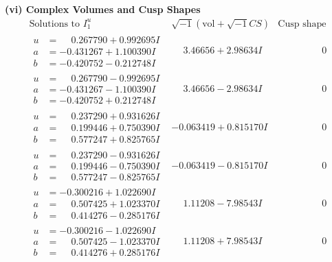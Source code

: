 \documentclass[1p]{elsarticle_modified}
\theoremstyle{definition}
\newcommand{\I}{\sqrt{-1}}
\begin{document}
\newpage\flushleft \textbf{(vi) Complex Volumes and Cusp Shapes}
$$\begin{array}{c|c|c}  
\text{Solutions to }I^u_{1}& \I (\text{vol} + \sqrt{-1}CS) & \text{Cusp shape}\\
 \hline 
\begin{aligned}
u &= \phantom{-}0.267790 + 0.992695 I \\
a &= -0.431267 + 1.100390 I \\
b &= -0.420752 - 0.212748 I\end{aligned}
 & \phantom{-}3.46656 + 2.98634 I & \phantom{-0.000000 } 0 \\ \hline\begin{aligned}
u &= \phantom{-}0.267790 - 0.992695 I \\
a &= -0.431267 - 1.100390 I \\
b &= -0.420752 + 0.212748 I\end{aligned}
 & \phantom{-}3.46656 - 2.98634 I & \phantom{-0.000000 } 0 \\ \hline\begin{aligned}
u &= \phantom{-}0.237290 + 0.931626 I \\
a &= \phantom{-}0.199446 + 0.750390 I \\
b &= \phantom{-}0.577247 + 0.825765 I\end{aligned}
 & -0.063419 + 0.815170 I & \phantom{-0.000000 } 0 \\ \hline\begin{aligned}
u &= \phantom{-}0.237290 - 0.931626 I \\
a &= \phantom{-}0.199446 - 0.750390 I \\
b &= \phantom{-}0.577247 - 0.825765 I\end{aligned}
 & -0.063419 - 0.815170 I & \phantom{-0.000000 } 0 \\ \hline\begin{aligned}
u &= -0.300216 + 1.022690 I \\
a &= \phantom{-}0.507425 + 1.023370 I \\
b &= \phantom{-}0.414276 - 0.285176 I\end{aligned}
 & \phantom{-}1.11208 - 7.98543 I & \phantom{-0.000000 } 0 \\ \hline\begin{aligned}
u &= -0.300216 - 1.022690 I \\
a &= \phantom{-}0.507425 - 1.023370 I \\
b &= \phantom{-}0.414276 + 0.285176 I\end{aligned}
 & \phantom{-}1.11208 + 7.98543 I & \phantom{-0.000000 } 0 \\ \hline\begin{aligned}

\end{aligned}
\end{array}$$
\end{document}
